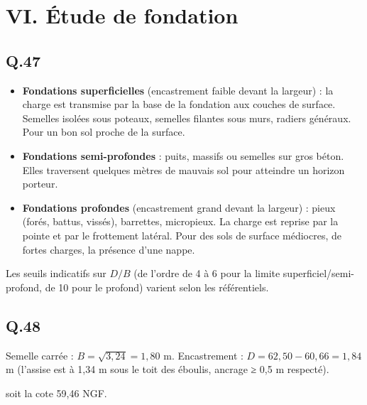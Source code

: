 \documentclass[11pt,a4paper]{article}
\providecommand{\tightlist}{\setlength{\itemsep}{0pt}\setlength{\parskip}{0pt}}
\newcommand{\equationajustee}[1]{%
  \sbox{\boiteequation}{$\displaystyle #1$}%
  \ifdim\wd\boiteequation>\linewidth
    \[\resizebox{\linewidth}{!}{\usebox{\boiteequation}}\]%
  \else
    \[#1\]%
  \fi}
\begin{document}
\hypertarget{vi.-uxe9tude-de-fondation}{%
\section{VI. Étude de fondation}\label{vi.-uxe9tude-de-fondation}}

\hypertarget{q.47}{%
\subsection{Q.47}\label{q.47}}

\begin{itemize}
\tightlist
\item
  \textbf{Fondations superficielles} (encastrement faible devant la largeur) : la charge est transmise par la base de la fondation aux couches de surface. Semelles isolées sous poteaux, semelles filantes sous murs, radiers généraux. Pour un bon sol proche de la surface.
\item
  \textbf{Fondations semi-profondes} : puits, massifs ou semelles sur gros béton. Elles traversent quelques mètres de mauvais sol pour atteindre un horizon porteur.
\item
  \textbf{Fondations profondes} (encastrement grand devant la largeur) : pieux (forés, battus, vissés), barrettes, micropieux. La charge est reprise par la pointe et par le frottement latéral. Pour des sols de surface médiocres, de fortes charges, la présence d'une nappe.
\end{itemize}

Les seuils indicatifs sur \(D/B\) (de l'ordre de 4 à 6 pour la limite superficiel/semi-\allowbreak{}profond, de 10 pour le profond) varient selon les référentiels.

\hypertarget{q.48}{%
\subsection{Q.48}\label{q.48}}

Semelle carrée : \(B=\sqrt{3{,}24}=1{,}80\) m. Encastrement : \(D=62{,}50-60{,}66=1{,}84\) m (l'assise est à 1,34 m sous le toit des éboulis, ancrage ≥ 0,5 m respecté).

\equationajustee{\begin{aligned}
z_e&=D+\frac23B\\
&=1{,}84+1{,}20\\
&=3{,}04\ \text{m}
\end{aligned}}

soit la cote 59,46 NGF.
\end{document}
